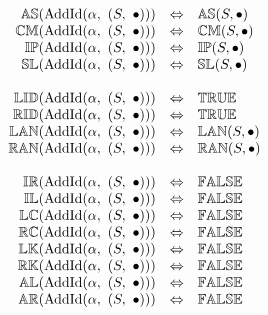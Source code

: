 \[
\begin{array}{rcl} 
{\mathbb{AS}}(\mathrm{AddId}(\alpha,\ (S,\ \bullet))) 
  & \Leftrightarrow
  & {\mathbb{AS}}(S, \bullet) \\
{\mathbb{CM}}(\mathrm{AddId}(\alpha,\ (S,\ \bullet))) 
  & \Leftrightarrow
  & {\mathbb{CM}}(S, \bullet) \\
{\mathbb{IP}}(\mathrm{AddId}(\alpha,\ (S,\ \bullet))) 
  & \Leftrightarrow
  & {\mathbb{IP}}(S, \bullet) \\
{\mathbb{SL}}(\mathrm{AddId}(\alpha,\ (S,\ \bullet))) 
  & \Leftrightarrow
  & {\mathbb{SL}}(S, \bullet) \\\\
  
{\mathbb{LID}}(\mathrm{AddId}(\alpha,\ (S,\ \bullet))) 
  & \Leftrightarrow
  & {\mathbb{TRUE}} \\ 
{\mathbb{RID}}(\mathrm{AddId}(\alpha,\ (S,\ \bullet))) 
  & \Leftrightarrow
  & {\mathbb{TRUE}} \\ 
{\mathbb{LAN}}(\mathrm{AddId}(\alpha,\ (S,\ \bullet))) 
  & \Leftrightarrow
  & {\mathbb{LAN}}(S, \bullet) \\
{\mathbb{RAN}}(\mathrm{AddId}(\alpha,\ (S,\ \bullet))) 
  & \Leftrightarrow
  & {\mathbb{RAN}}(S, \bullet) \\\\
  
{\mathbb{IR}}(\mathrm{AddId}(\alpha,\ (S,\ \bullet))) 
  & \Leftrightarrow
  & {\mathbb{FALSE}}\\ 
{\mathbb{IL}}(\mathrm{AddId}(\alpha,\ (S,\ \bullet))) 
  & \Leftrightarrow
  & {\mathbb{FALSE}}\\ 
{\mathbb{LC}}(\mathrm{AddId}(\alpha,\ (S,\ \bullet))) 
  & \Leftrightarrow
  & {\mathbb{FALSE}} \\
{\mathbb{RC}}(\mathrm{AddId}(\alpha,\ (S,\ \bullet))) 
  & \Leftrightarrow
  & {\mathbb{FALSE}} \\
{\mathbb{LK}}(\mathrm{AddId}(\alpha,\ (S,\ \bullet))) 
  & \Leftrightarrow
  & {\mathbb{FALSE}}\\ 
{\mathbb{RK}}(\mathrm{AddId}(\alpha,\ (S,\ \bullet))) 
  & \Leftrightarrow
  & {\mathbb{FALSE}}\\ 
{\mathbb{AL}}(\mathrm{AddId}(\alpha,\ (S,\ \bullet))) 
  & \Leftrightarrow
  & {\mathbb{FALSE}}\\ 
{\mathbb{AR}}(\mathrm{AddId}(\alpha,\ (S,\ \bullet))) 
  & \Leftrightarrow
  & {\mathbb{FALSE}}\\ 
\end{array} 
\] 
